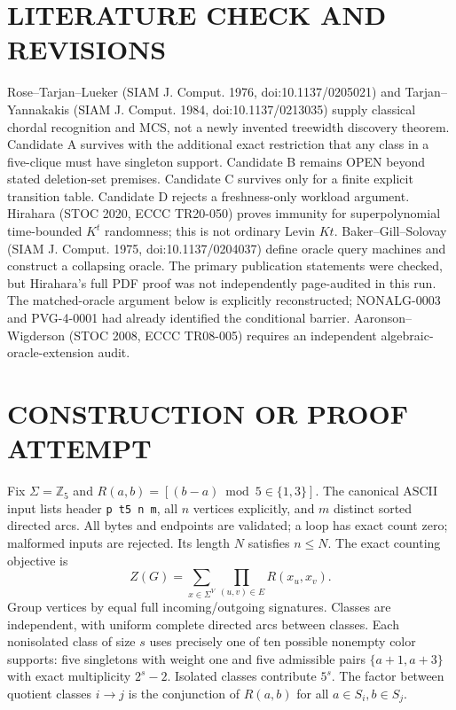 \documentclass[11pt]{article}
\begin{document}
\section{LITERATURE CHECK AND REVISIONS}
Rose--Tarjan--Lueker (SIAM J. Comput. 1976, doi:10.1137/0205021) and Tarjan--Yannakakis (SIAM J. Comput. 1984, doi:10.1137/0213035) supply classical chordal recognition and MCS, not a newly invented treewidth discovery theorem. Candidate A survives with the additional exact restriction that any class in a five-clique must have singleton support. Candidate B remains OPEN beyond stated deletion-set premises. Candidate C survives only for a finite explicit transition table. Candidate D rejects a freshness-only workload argument.
Hirahara (STOC 2020, ECCC TR20-050) proves immunity for superpolynomial time-bounded $K^t$ randomness; this is not ordinary Levin $Kt$. Baker--Gill--Solovay (SIAM J. Comput. 1975, doi:10.1137/0204037) define oracle query machines and construct a collapsing oracle. The primary publication statements were checked, but Hirahara's full PDF proof was not independently page-audited in this run. The matched-oracle argument below is explicitly reconstructed; NONALG-0003 and PVG-4-0001 had already identified the conditional barrier. Aaronson--Wigderson (STOC 2008, ECCC TR08-005) requires an independent algebraic-oracle-extension audit.
\section{CONSTRUCTION OR PROOF ATTEMPT}
Fix $\Sigma=\mathbb{Z}_5$ and $R(a,b)=[(b-a)\bmod5\in\{1,3\}]$. The canonical ASCII input lists header \texttt{p t5 n m}, all $n$ vertices explicitly, and $m$ distinct sorted directed arcs. All bytes and endpoints are validated; a loop has exact count zero; malformed inputs are rejected. Its length $N$ satisfies $n\le N$. The exact counting objective is
\[
Z(G)=\sum_{x\in\Sigma^V}\prod_{(u,v)\in E}R(x_u,x_v).
\]
Group vertices by equal full incoming/outgoing signatures. Classes are independent, with uniform complete directed arcs between classes. Each nonisolated class of size $s$ uses precisely one of ten possible nonempty color supports: five singletons with weight one and five admissible pairs $\{a+1,a+3\}$ with exact multiplicity $2^s-2$. Isolated classes contribute $5^s$. The factor between quotient classes $i\to j$ is the conjunction of $R(a,b)$ for all $a\in S_i,b\in S_j$.
\end{document}
